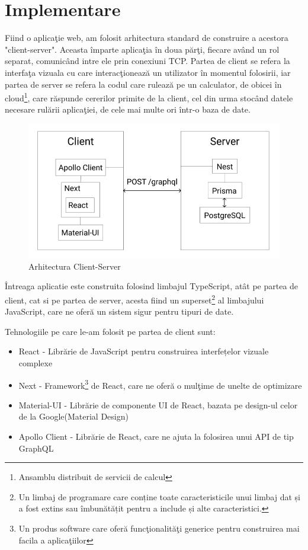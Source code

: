 \documentclass[12pt, a4paper, oneside, romanian]{teza-upb}
\begin{document}
\chapter{Implementare}

Fiind o aplicaţie web, am folosit arhitectura standard de construire a acestora "client-server". Aceasta împarte aplicaţia în doua părţi, fiecare având un rol separat, comunicând intre ele prin conexiuni TCP. Partea de client se refera la interfaţa vizuala cu care interacţionează un utilizator în momentul folosirii, iar partea de server se refera la codul care rulează pe un calculator, de obicei în cloud\footnote{Ansamblu distribuit de servicii de calcul}, care răspunde cererilor primite de la client, cel din urma stocând datele necesare rulării aplicaţiei, de cele mai multe ori într-o baza de date.

\begin{figure}[H]
\centering
\includegraphics*[width=0.7\columnwidth]{arhitectura-client-server}
\caption{Arhitectura Client-Server}
\label{arhitectura-client-server}
\end{figure}

Întreaga aplicatie este construita folosind limbajul TypeScript, atât pe partea de client, cat si pe partea de server, acesta fiind un superset\footnote{Un limbaj de programare care conține toate caracteristicile unui limbaj dat și a fost extins sau îmbunătățit pentru a include și alte caracteristici.} al limbajului JavaScript, care ne oferă un sistem sigur pentru tipuri de date.

Tehnologiile pe care le-am folosit pe partea de client sunt:
\begin{itemize}
	\item React - Librărie de JavaScript pentru construirea interfețelor vizuale complexe
	\item Next - Framework\footnote{Un produs software care oferă funcţionalităţi generice pentru construirea mai facila a aplicaţiilor} de React, care ne oferă o mulţime de unelte de optimizare
	\item Material-UI - Librărie de componente UI de React, bazata pe design-ul celor de la Google(Material Design)
	\item Apollo Client - Librărie de React, care ne ajuta la folosirea unui API de tip GraphQL
\end{itemize}
\end{document}
